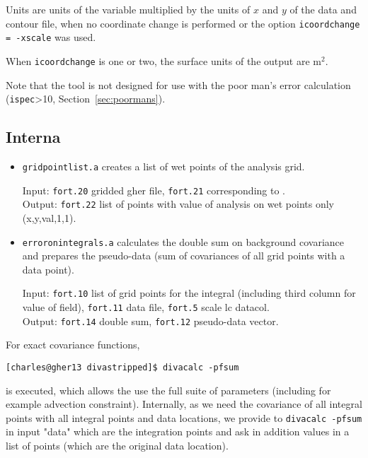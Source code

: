 Units are units of the variable multiplied by the units of $x$ and $y$ of the data and contour file, when no coordinate change is performed or the option {\tt icoordchange = -xscale} was used.

When {\tt icoordchange} is one or two, the surface units of the output are m$^2$.

Note that the tool is not designed for use with the poor man's error calculation (\texttt{ispec}>10, Section~\ref{sec:poormans}).

\subsection{Interna}

\begin{itemize}

\item \texttt{gridpointlist.a} creates a list of wet points of the analysis grid. 

Input: \texttt{fort.20} gridded gher file, \texttt{fort.21} corresponding to .\\ 
Output: \texttt{fort.22} list of points with value of analysis on wet points only (x,y,val,1,1).

\item \texttt{erroronintegrals.a} calculates the double sum on background covariance and prepares the pseudo-data (sum of covariances of all grid points with a  data point).

Input: \texttt{fort.10} list of grid points for the integral (including third column for value of field), \texttt{fort.11} data file, \texttt{fort.5} scale lc datacol.\\
Output: \texttt{fort.14} double sum, \texttt{fort.12} pseudo-data vector.
\end{itemize}

For exact covariance functions, 

\begin{lstlisting}[style=Bash]
[charles@gher13 divastripped]$ divacalc -pfsum
\end{lstlisting}

is executed, which allows the use the full suite of \diva parameters (including for example advection constraint). Internally, as we need the covariance of all integral points with all integral points and data locations, we provide to {\tt divacalc -pfsum} in input "data" which are the integration points and ask in addition values in a list of points (which are the original data location).

